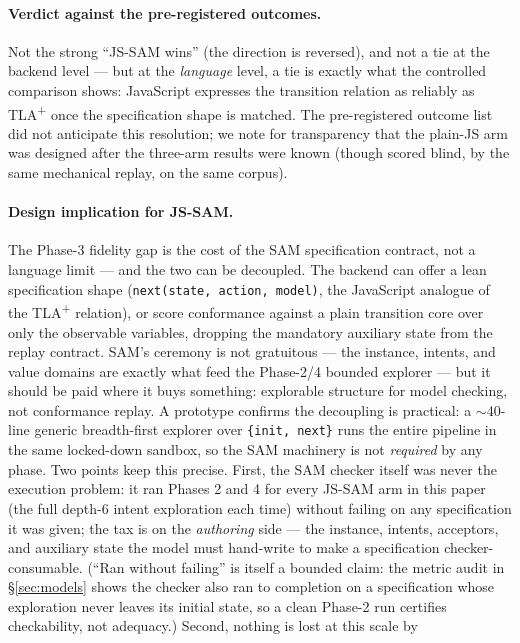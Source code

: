 \documentclass[11pt]{article}
\newcommand{\jssam}{JS-SAM}
\newcommand{\tlaplus}{TLA\texorpdfstring{\textsuperscript{+}}{+}}
\begin{document}
\paragraph{Verdict against the pre-registered outcomes.}
Not the strong ``\jssam{} wins'' (the direction is reversed), and not a tie
at the backend level --- but at the \emph{language} level, a tie is exactly
what the controlled comparison shows: JavaScript expresses the transition
relation as reliably as \tlaplus{} once the specification shape is matched.
The pre-registered outcome list did not anticipate this resolution; we note
for transparency that the plain-JS arm was designed after the three-arm
results were known (though scored blind, by the same mechanical replay, on
the same corpus).

\paragraph{Design implication for \jssam{}.}
The Phase-3 fidelity gap is the cost of the SAM specification contract, not
a language limit --- and the two can be decoupled. The backend can offer a
lean specification shape (\texttt{next(state, action, model)}, the JavaScript
analogue of the \tlaplus{} relation), or score conformance against a plain
transition core over only the observable variables, dropping the mandatory
auxiliary state from the replay contract. SAM's ceremony is not gratuitous
--- the instance, intents, and value domains are exactly what feed the
Phase-2/4 bounded explorer --- but it should be paid where it buys
something: explorable structure for model checking, not conformance replay.
A prototype confirms the decoupling is practical: a $\sim$40-line generic
breadth-first explorer over \texttt{\{init, next\}} runs the entire pipeline
in the same locked-down sandbox, so the SAM machinery is not \emph{required}
by any phase. Two points keep this precise. First, the SAM checker itself
was never the execution problem: it ran Phases 2 and 4 for every \jssam{} arm
in this paper (the full depth-6 intent exploration each time) without failing
on any specification it was given; the tax is on the \emph{authoring} side ---
the instance, intents, acceptors, and auxiliary state the model must
hand-write to make a specification checker-consumable. (``Ran without
failing'' is itself a bounded claim: the metric audit in \S\ref{sec:models}
shows the checker also ran to completion on a specification whose exploration
never leaves its initial state, so a clean Phase-2 run certifies
checkability, not adequacy.) Second, nothing is lost at this scale by
\end{document}

